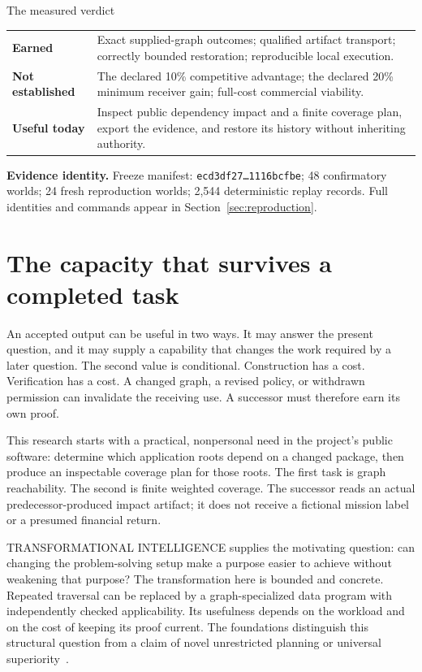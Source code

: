 \documentclass[11pt,letterpaper]{article}
\begin{document}
\begin{evidencebox}{The measured verdict}
\begin{tabularx}{\linewidth}{@{}lY@{}}
\textbf{Earned} & Exact supplied-graph outcomes; qualified artifact transport; correctly bounded restoration; reproducible local execution.\\
\textbf{Not established} & The declared 10\% competitive advantage; the declared 20\% minimum receiver gain; full-cost commercial viability.\\
\textbf{Useful today} & Inspect public dependency impact and a finite coverage plan, export the evidence, and restore its history without inheriting authority.\\
\end{tabularx}
\end{evidencebox}
\smallskip
{\small\textbf{Evidence identity.} Freeze manifest: \texttt{ecd3df27\ldots1116bcfbe}; 48 confirmatory worlds; 24 fresh reproduction worlds; 2,544 deterministic replay records. Full identities and commands appear in Section~\ref{sec:reproduction}.}
\clearpage
\section{The capacity that survives a completed task}
An accepted output can be useful in two ways. It may answer the present question, and it may supply a capability that changes the work required by a later question. The second value is conditional. Construction has a cost. Verification has a cost. A changed graph, a revised policy, or withdrawn permission can invalidate the receiving use. A successor must therefore earn its own proof.

This research starts with a practical, nonpersonal need in the project's public software: determine which application roots depend on a changed package, then produce an inspectable coverage plan for those roots. The first task is graph reachability. The second is finite weighted coverage. The successor reads an actual predecessor-produced impact artifact; it does not receive a fictional mission label or a presumed financial return.

TRANSFORMATIONAL INTELLIGENCE supplies the motivating question: can changing the problem-solving setup make a purpose easier to achieve without weakening that purpose? The transformation here is bounded and concrete. Repeated traversal can be replaced by a graph-specialized data program with independently checked applicability. Its usefulness depends on the workload and on the cost of keeping its proof current. The foundations distinguish this structural question from a claim of novel unrestricted planning or universal superiority~\cite{boucher2026ti,boucher2026execute,boucher2026economy}.
\end{document}

